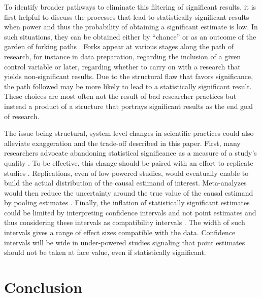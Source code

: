 \documentclass[usletter, 12pt]{article}
\begin{document}
		To identify broader pathways to eliminate this filtering of significant results, it is first helpful to discuss the processes that lead to statistically significant results when power and thus the probability of obtaining a significant estimate is low. In such situations, they can be obtained either by ``chance'' or as an outcome of the garden of forking paths \citep{simmons_false-positive_2011, gelman_garden_2013, kasy_forking_2021}. Forks appear at various stages along the path of research, for instance in data preparation, regarding the inclusion of a given control variable or later, regarding whether to carry on with a research that yields non-significant results. Due to the structural flaw that favors significance, the path followed may be more likely to lead to a statistically significant result. These choices are most often not the result of bad researcher practices but instead a product of a structure that portrays significant results as the end goal of research. 
		
		The issue being structural, system level changes in scientific practices could also alleviate exaggeration and the trade-off described in this paper. First, many researchers advocate abandoning statistical significance as a measure of a study's quality \citep{mcshane_abandon_2019}. To be effective, this change should be paired with an effort to replicate studies \citep{christensen_transparency_2018}. Replications, even of low powered studies, would eventually enable to build the actual distribution of the causal estimand of interest. Meta-analyzes would then reduce the uncertainty around the true value of the causal estimand by pooling estimates \citep{hernan_causal_2021}. Finally, the inflation of statistically significant estimates could be limited by interpreting confidence intervals and not point estimates and thus considering these intervals as compatibility intervals \citep{shadish_experimental_2002, amrhein_inferential_2019, romer_praise_2020}. The width of such intervals gives a range of effect sizes compatible with the data. Confidence intervals will be wide in under-powered studies signaling that point estimates should not be taken at face value, even if statistically significant.




\section{Conclusion} \label{conclusion}
\end{document}
